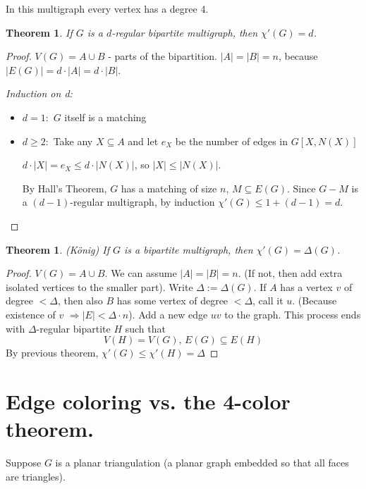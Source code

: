 \documentclass[a4paper]{article}
\theoremstyle{plain}
\newtheorem{theorem}[lemma]{Theorem}
\theoremstyle{myremark}
\begin{document}
In this multigraph every vertex has a degree 4.

\begin{theorem}
If $G$ is a $d$-regular bipartite multigraph, then $\chi'(G)=d$.
\end{theorem}

\begin{proof}
$V(G)=A\cup B$ - parts of the bipartition. $|A|=|B|=n$, because $|E(G)|=d\cdot |A|=d\cdot |B|$.

\emph{Induction on d:}
\begin{itemize}
    \item $d=1:$ $G$ itself is a matching
    \item $d\geq 2:$ Take any $X\subseteq A$ and let $e_X$ be the number of edges in $G[X,N(X)]$

    $d\cdot |X|=e_X\leq d\cdot |N(X)|$, so $|X|\leq |N(X)|$. 
    
    By Hall's Theorem, $G$ has a matching of size $n$, $M\subseteq E(G)$. Since $G-M$ is a $(d-1)$-regular multigraph, by induction $\chi'(G)\leq 1 + (d-1) = d$.
\end{itemize}
\end{proof}

\begin{theorem}(K\"onig)
If $G$ is a bipartite multigraph, then $\chi'(G)=\Delta (G)$.
\end{theorem}

\begin{proof}
$V(G)=A\cup B$. We can assume $|A|=|B|=n$. (If not, then add extra isolated vertices to the smaller part). Write $\Delta := \Delta(G)$. If $A$ has a vertex $v$ of degree $<\Delta$, then also $B$ has some vertex of degree $<\Delta$, call it $u$. (Because existence of $v$ $\Rightarrow |E|<\Delta\cdot n$). Add a new edge $uv$ to the graph. This process ends with $\Delta$-regular bipartite $H$ such that
$$
V(H) = V(G),\,E(G)\subseteq E(H)
$$
By previous theorem, $\chi'(G)\leq \chi'(H)=\Delta$
\end{proof}

\section*{Edge coloring vs. the 4-color theorem.}

Suppose $G$ is a planar triangulation (a planar graph embedded so that all faces are triangles). 
\end{document}
